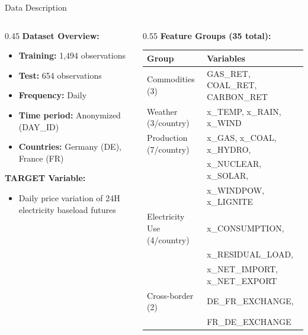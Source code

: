 \documentclass[aspectratio=169]{beamer}
\begin{document}
\begin{frame}{Data Description}
\begin{columns}
\begin{column}{0.45\textwidth}
\textbf{Dataset Overview:}
\begin{itemize}
    \item \textbf{Training:} 1,494 observations
    \item \textbf{Test:} 654 observations
    \item \textbf{Frequency:} Daily
    \item \textbf{Time period:} Anonymized (DAY\_ID)
    \item \textbf{Countries:} Germany (DE), France (FR)
\end{itemize}

\vspace{0.2cm}
\textbf{TARGET Variable:}
\begin{itemize}
    \item Daily price variation of 24H electricity baseload futures
\end{itemize}
\end{column}

\begin{column}{0.55\textwidth}
\textbf{Feature Groups (35 total):}
\begin{table}
\tiny
\begin{tabular}{l|l}
\toprule
\textbf{Group} & \textbf{Variables} \\
\midrule
Commodities (3) & GAS\_RET, COAL\_RET, CARBON\_RET \\
Weather (3/country) & x\_TEMP, x\_RAIN, x\_WIND \\
Production (7/country) & x\_GAS, x\_COAL, x\_HYDRO, \\
& x\_NUCLEAR, x\_SOLAR, \\
& x\_WINDPOW, x\_LIGNITE \\
Electricity Use (4/country) & x\_CONSUMPTION, \\
& x\_RESIDUAL\_LOAD, \\
& x\_NET\_IMPORT, x\_NET\_EXPORT \\
Cross-border (2) & DE\_FR\_EXCHANGE, \\
& FR\_DE\_EXCHANGE \\
\bottomrule
\end{tabular}
\end{table}
\end{column}
\end{columns}
\end{frame}
\end{document}
